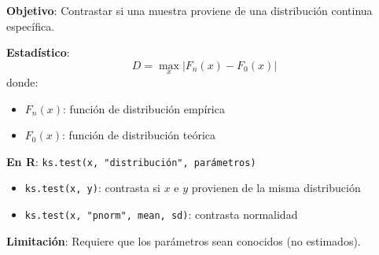 \documentclass[10pt,a4paper]{article}
\begin{document}
\begin{tcolorbox}[title=Test de Kolmogorov-Smirnov (K-S)]
    \textbf{Objetivo}: Contrastar si una muestra proviene de una distribución continua específica.
    
    \textbf{Estadístico}:
    \[
        D = \max_x |F_n(x) - F_0(x)|
    \]
    donde:
    \begin{itemize}
        \item $F_n(x)$: función de distribución empírica
        \item $F_0(x)$: función de distribución teórica
    \end{itemize}
    
    \textbf{En R}: \texttt{ks.test(x, "distribución", parámetros)}
    \begin{itemize}
        \item \texttt{ks.test(x, y)}: contrasta si $x$ e $y$ provienen de la misma distribución
        \item \texttt{ks.test(x, "pnorm", mean, sd)}: contrasta normalidad
    \end{itemize}
    
    \textbf{Limitación}: Requiere que los parámetros sean conocidos (no estimados).
\end{tcolorbox}
\end{document}

